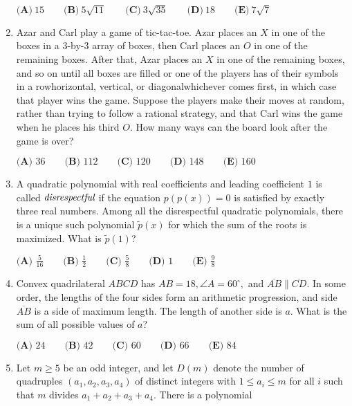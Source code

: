 \documentclass{article}
\begin{document}
\begin{enumerate}[label=\arabic*., itemsep=0.5em]
\(\textbf{(A)}\: 15\qquad\textbf{(B)} \: 5\sqrt{11}\qquad\textbf{(C)} \: 3\sqrt{35}\qquad\textbf{(D)} \: 18\qquad\textbf{(E)} \: 7\sqrt{7}\)\par \vspace{0.5em}\item Azar and Carl play a game of tic-tac-toe. Azar places an \(X\) in one of the boxes in a \(3\)-by-\(3\) array of boxes, then Carl places an \(O\) in one of the remaining boxes. After that, Azar places an \(X\) in one of the remaining boxes, and so on until all boxes are filled or one of the players has of their symbols in a rowhorizontal, vertical, or diagonalwhichever comes first, in which case that player wins the game. Suppose the players make their moves at random, rather than trying to follow a rational strategy, and that Carl wins the game when he places his third \(O\). How many ways can the board look after the game is over?

\(\textbf{(A) } 36 \qquad\textbf{(B) } 112 \qquad\textbf{(C) } 120 \qquad\textbf{(D) } 148 \qquad\textbf{(E) } 160\)\par \vspace{0.5em}\item A quadratic polynomial with real coefficients and leading coefficient \(1\) is called \(\emph{disrespectful}\) if the equation \(p(p(x))=0\) is satisfied by exactly three real numbers. Among all the disrespectful quadratic polynomials, there is a unique such polynomial \(\tilde{p}(x)\) for which the sum of the roots is maximized. What is \(\tilde{p}(1)\)?

\(\textbf{(A) } \frac{5}{16} \qquad\textbf{(B) } \frac{1}{2} \qquad\textbf{(C) } \frac{5}{8} \qquad\textbf{(D) } 1 \qquad\textbf{(E) } \frac{9}{8}\)\par \vspace{0.5em}\item Convex quadrilateral \(ABCD\) has \(AB = 18, \angle{A} = 60^\circ,\) and \(\overline{AB} \parallel \overline{CD}.\) In some order, the lengths of the four sides form an arithmetic progression, and side \(\overline{AB}\) is a side of maximum length. The length of another side is \(a.\) What is the sum of all possible values of \(a\)?

\(\textbf{(A) } 24 \qquad \textbf{(B) } 42 \qquad \textbf{(C) } 60 \qquad \textbf{(D) } 66 \qquad \textbf{(E) } 84\)\par \vspace{0.5em}\item Let \(m\ge 5\) be an odd integer, and let \(D(m)\) denote the number of quadruples \((a_1, a_2, a_3, a_4)\) of distinct integers with \(1\le a_i \le m\) for all \(i\) such that \(m\) divides \(a_1+a_2+a_3+a_4\). There is a polynomial


\end{enumerate}
\end{document}
